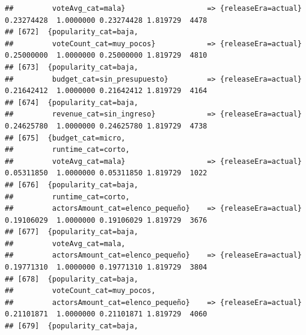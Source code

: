 \documentclass[
]{article}
\begin{document}
\begin{verbatim}
##         voteAvg_cat=mala}                   => {releaseEra=actual}               0.23274428  1.0000000 0.23274428 1.819729  4478
## [672]  {popularity_cat=baja,                                                                                                    
##         voteCount_cat=muy_pocos}            => {releaseEra=actual}               0.25000000  1.0000000 0.25000000 1.819729  4810
## [673]  {popularity_cat=baja,                                                                                                    
##         budget_cat=sin_presupuesto}         => {releaseEra=actual}               0.21642412  1.0000000 0.21642412 1.819729  4164
## [674]  {popularity_cat=baja,                                                                                                    
##         revenue_cat=sin_ingreso}            => {releaseEra=actual}               0.24625780  1.0000000 0.24625780 1.819729  4738
## [675]  {budget_cat=micro,                                                                                                       
##         runtime_cat=corto,                                                                                                      
##         voteAvg_cat=mala}                   => {releaseEra=actual}               0.05311850  1.0000000 0.05311850 1.819729  1022
## [676]  {popularity_cat=baja,                                                                                                    
##         runtime_cat=corto,                                                                                                      
##         actorsAmount_cat=elenco_pequeño}    => {releaseEra=actual}               0.19106029  1.0000000 0.19106029 1.819729  3676
## [677]  {popularity_cat=baja,                                                                                                    
##         voteAvg_cat=mala,                                                                                                       
##         actorsAmount_cat=elenco_pequeño}    => {releaseEra=actual}               0.19771310  1.0000000 0.19771310 1.819729  3804
## [678]  {popularity_cat=baja,                                                                                                    
##         voteCount_cat=muy_pocos,                                                                                                
##         actorsAmount_cat=elenco_pequeño}    => {releaseEra=actual}               0.21101871  1.0000000 0.21101871 1.819729  4060
## [679]  {popularity_cat=baja,                                                                                                    

\end{verbatim}
\end{document}
